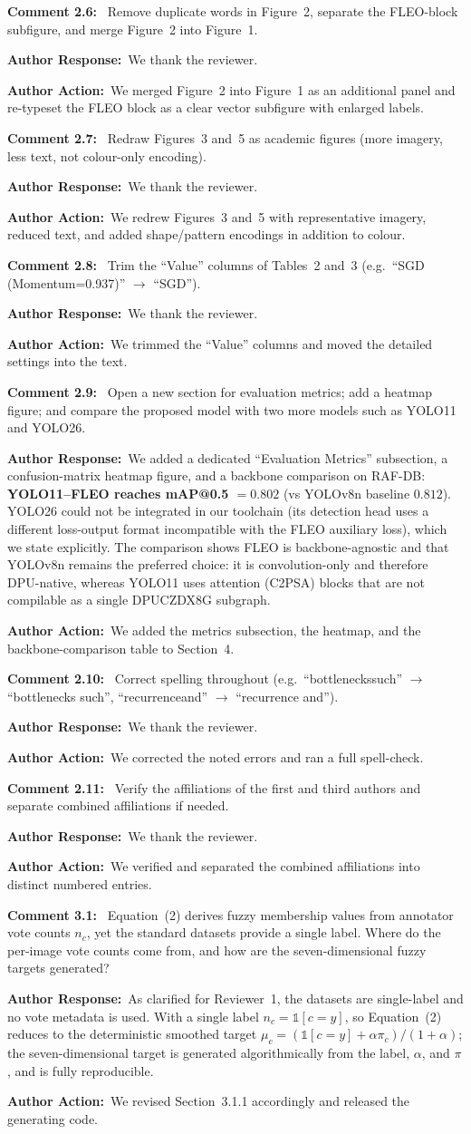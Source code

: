 \documentclass[11pt]{article}
\newcommand{\comment}[1]{\smallskip\noindent\textbf{\color{navy}Comment #1:}\ }
\newcommand{\response}{\smallskip\par\noindent\textbf{\color{steel}Author Response:}\ }
\newcommand{\action}{\smallskip\par\noindent\textbf{\color{steel}Author Action:}\ }
\newcommand{\rev}[1]{\medskip\par\noindent{\large\bfseries\color{navy}#1}\par\smallskip}
\begin{document}
\comment{2.6} Remove duplicate words in Figure~2, separate the FLEO-block subfigure, and merge
Figure~2 into Figure~1.
\response We thank the reviewer.
\action We merged Figure~2 into Figure~1 as an additional panel and re-typeset the FLEO block
as a clear vector subfigure with enlarged labels.

\comment{2.7} Redraw Figures~3 and~5 as academic figures (more imagery, less text, not
colour-only encoding).
\response We thank the reviewer.
\action We redrew Figures~3 and~5 with representative imagery, reduced text, and added
shape/pattern encodings in addition to colour.

\comment{2.8} Trim the ``Value'' columns of Tables~2 and~3 (e.g.\ ``SGD (Momentum=0.937)''
$\rightarrow$ ``SGD'').
\response We thank the reviewer.
\action We trimmed the ``Value'' columns and moved the detailed settings into the text.

\comment{2.9} Open a new section for evaluation metrics; add a heatmap figure; and compare the
proposed model with two more models such as YOLO11 and YOLO26.
\response We added a dedicated ``Evaluation Metrics'' subsection, a confusion-matrix heatmap
figure, and a backbone comparison on RAF-DB: \textbf{YOLO11--FLEO reaches mAP@0.5 $=0.802$}
(vs YOLOv8n baseline $0.812$). YOLO26 could not be integrated in our toolchain (its detection
head uses a different loss-output format incompatible with the FLEO auxiliary loss), which we
state explicitly. The comparison shows FLEO is backbone-agnostic and that YOLOv8n remains the
preferred choice: it is convolution-only and therefore DPU-native, whereas YOLO11 uses
attention (C2PSA) blocks that are not compilable as a single DPUCZDX8G subgraph.
\action We added the metrics subsection, the heatmap, and the backbone-comparison table to
Section~4.

\comment{2.10} Correct spelling throughout (e.g.\ ``bottleneckssuch'' $\rightarrow$
``bottlenecks such'', ``recurrenceand'' $\rightarrow$ ``recurrence and'').
\response We thank the reviewer.
\action We corrected the noted errors and ran a full spell-check.

\comment{2.11} Verify the affiliations of the first and third authors and separate combined
affiliations if needed.
\response We thank the reviewer.
\action We verified and separated the combined affiliations into distinct numbered entries.

\rev{Reviewer 3}

\comment{3.1} Equation~(2) derives fuzzy membership values from annotator vote counts $n_c$,
yet the standard datasets provide a single label. Where do the per-image vote counts come
from, and how are the seven-dimensional fuzzy targets generated?
\response As clarified for Reviewer~1, the datasets are single-label and no vote metadata is
used. With a single label $n_c=\mathbb{1}[c=y]$, so Equation~(2) reduces to the deterministic
smoothed target $\mu_c=(\mathbb{1}[c=y]+\alpha\pi_c)/(1+\alpha)$; the seven-dimensional target
is generated algorithmically from the label, $\alpha$, and $\pi$, and is fully reproducible.
\action We revised Section~3.1.1 accordingly and released the generating code.
\end{document}
